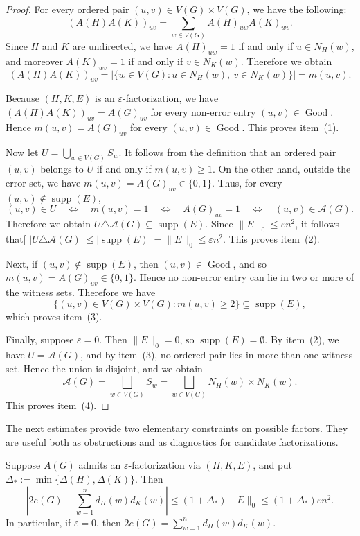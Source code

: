 \documentclass{file}
\newcommand{\eps}{\varepsilon}
\newcommand{\supp}{\operatorname{supp}}
\newcommand{\Good}{\operatorname{Good}}
\begin{document}
\begin{proof}
For every ordered pair $(u,v)\in V(G)\times V(G)$, we have the following:
\[
  (A(H)A(K))_{uv}
  =
  \sum_{w\in V(G)} A(H)_{uw}A(K)_{wv}.
\]
Since $H$ and $K$ are undirected,
we have $A(H)_{uw}=1$ if and only if $u\in N_H(w)$,
and moreover  $A(K)_{wv}=1$ if and only if $v\in N_K(w)$.
Therefore we obtain
\[
  (A(H)A(K))_{uv}
  =
  |\{w\in V(G):u\in N_H(w),\ v\in N_K(w)\}|
  =
  m(u,v).
\]

Because $(H,K,E)$ is an $\eps$-factorization, we have
$(A(H)A(K))_{uv}=A(G)_{uv}$ for every non-error entry $(u,v)\in\Good$.  
Hence $m(u,v)=A(G)_{uv}$ for every $(u,v)\in\Good$.  
This proves item~(1).

Now let $U=\bigcup_{w\in V(G)} S_w$.
It follows from the definition that an ordered pair $(u,v)$ belongs to $U$ if and only if $m(u,v)\ge 1$.  
On the other hand, outside the error set, we have
$m(u,v)=A(G)_{uv}\in\{0,1\}$.
Thus, for every $(u,v)\notin\supp(E)$,
\[
  (u,v)\in U
  \quad\Longleftrightarrow\quad
  m(u,v)=1
  \quad\Longleftrightarrow\quad
  A(G)_{uv}=1
  \quad\Longleftrightarrow\quad
  (u,v)\in\mathcal A(G).
\]
Therefore we obtain $U\triangle \mathcal A(G)\subseteq \supp(E)$.
Since $\|E\|_0\le \eps n^2$, it follows that[
$|U\triangle \mathcal A(G)|
  \le
  |\supp(E)|
  =
  \|E\|_0
  \le
  \eps n^2$.
This proves item~(2).

Next, if $(u,v)\notin\supp(E)$, then $(u,v)\in\Good$, and so $m(u,v)=A(G)_{uv}\in\{0,1\}$.
Hence no non-error entry can lie in two or more of the witness sets.  
Therefore we have 
\[
  \{(u,v)\in V(G)\times V(G):m(u,v)\ge 2\}\subseteq \supp(E),
\]
which proves item~(3).

Finally, suppose $\eps=0$.  Then $\|E\|_0=0$, so $\supp(E)=\emptyset$.  By
item~(2), we have $U=\mathcal A(G)$, and by item~(3), no ordered pair lies in more than one witness set.  
Hence the union is disjoint, and we obtain
\[
  \mathcal A(G)
  =
  \bigsqcup_{w\in V(G)} S_w
  =
  \bigsqcup_{w\in V(G)} N_H(w)\times N_K(w).
\]
This proves item~(4).
\end{proof}



The next estimates provide two elementary constraints on possible factors.  They
are useful both as obstructions and as diagnostics for candidate
factorizations.

\begin{lem}
\label{lem:walk-count}
\label{lem:degree-product-error}
Suppose $A(G)$ admits an $\eps$-factorization via $(H,K,E)$, and put $\Delta_*:=\min\{\Delta(H),\Delta(K)\}$.
Then
\[
  \left|
  2e(G)-\sum_{w=1}^n d_H(w)d_K(w)
  \right|
  \le
  (1+\Delta_*)\|E\|_0
  \le
  (1+\Delta_*)\eps n^2.
\]
In particular, if $\eps=0$, then $2e(G)=\sum_{w=1}^n d_H(w)d_K(w)$.
\end{lem}
\end{document}
